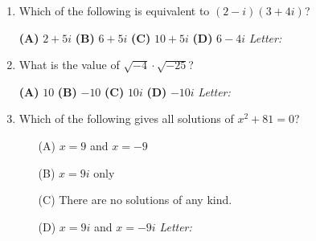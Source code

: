 \documentclass[10pt]{article}
\begin{document}
\begin{enumerate}[leftmargin=1.9em, itemsep=14pt]

\item Which of the following is equivalent to $(2 - i)(3 + 4i)$?

      \smallskip
      \textbf{(A)} $2 + 5i$ \hspace{2.2em} \textbf{(B)} $6 + 5i$ \hspace{2.2em} \textbf{(C)} $10 + 5i$ \hspace{2.2em} \textbf{(D)} $6 - 4i$ \hfill\textit{Letter:}~\gradedblank[id=ap1, type=choice, points=1, answer=C]{0.42in}{13pt}

\item What is the value of $\sqrt{-4}\cdot\sqrt{-25}$?

      \smallskip
      \textbf{(A)} $10$ \hspace{2.2em} \textbf{(B)} $-10$ \hspace{2.2em} \textbf{(C)} $10i$ \hspace{2.2em} \textbf{(D)} $-10i$ \hfill\textit{Letter:}~\gradedblank[id=ap2, type=choice, points=1, answer=B]{0.42in}{13pt}

\item Which of the following gives all solutions of $x^2 + 81 = 0$?
      \begin{enumerate}[leftmargin=2.6em, itemsep=2pt]
        \item[(A)] $x = 9$ and $x = -9$
        \item[(B)] $x = 9i$ only
        \item[(C)] There are no solutions of any kind.
        \item[(D)] $x = 9i$ and $x = -9i$ \hfill\textit{Letter:}~\gradedblank[id=ap3, type=choice, points=1, answer=D]{0.42in}{13pt}
      \end{enumerate}


\end{enumerate}
\end{document}
